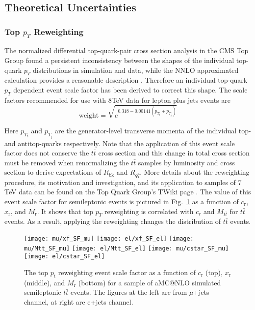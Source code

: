 \subsection{Theoretical Uncertainties}

\subsubsection{Top $p_{T}$ Reweighting}

The normalized differential top-quark-pair cross section analysis in the CMS Top Group found a persistent inconsistency between the shapes of the individual top-quark $p_{T}$ distributions in simulation and data, while the NNLO approximated calculation \cite{Kidonakis2012} provides a reasonable description \cite{pT_reweighting_TWiki}. Therefore an individual top-quark $p_{T}$ dependent event scale factor has been derived to correct this shape. The scale factors recommended for use with 8TeV data for lepton plus jets events are 
\begin{equation}
\mathrm{weight} = \sqrt{e^{0.318-0.00141(p_{T_{t}}+p_{T_{\bar{t}}})}}
\end{equation}

Here $p_{T_t}$ and $p_{T_{\bar t}}$ are the generator-level transverse momenta of the individual top- and antitop-quarks respectively. Note that the application of this event scale factor does not conserve the $t\bar{t}$ cross section and this change in total cross section must be removed when renormalizing the $t\bar{t}$ samples by luminosity and cross section to derive expectations of $R_\mathrm{bk}$ and $R_{q\bar q}$. More details about the reweighting procedure, its motivation and investigation, and its application to samples of 7 TeV data can be found on the Top Quark Group's TWiki page \cite{pT_reweighting_TWiki}. The value of this event scale factor for semileptonic events is pictured in Fig.~\ref{fig:top_pT_SF} as a function of $c_\mathrm{r}$, $x_\mathrm{r}$, and $M_\mathrm{r}$. It shows that top $p_T$ reweighting is correlated with $c_r$ and $M_{t\bar t}$ for $t\bar{t}$ events. As a result, applying the reweighting changes the distribution of $t\bar{t}$ events.

\begin{figure}[hbt]
  \begin{center}
    \texttt{[image: mu/xf\_SF\_mu]}
    \texttt{[image: el/xf\_SF\_el]}   
    \texttt{[image: mu/Mtt\_SF\_mu]}
    \texttt{[image: el/Mtt\_SF\_el]}
    \texttt{[image: mu/cstar\_SF\_mu]}
    \texttt{[image: el/cstar\_SF\_el]}
  \caption{\small The top $p_{t}$ reweighting event scale factor as a function of $c_\mathrm{r}$ (top), $x_\mathrm{r}$ (middle), and $M_\mathrm{r}$ (bottom) for a sample of aMC@NLO simulated semileptonic $t\bar{t}$ events.  The figures at the left are from $\mu$+jets channel, at right are e+jets channel.}
    \label{fig:top_pT_SF}
  \end{center}
\end{figure}

